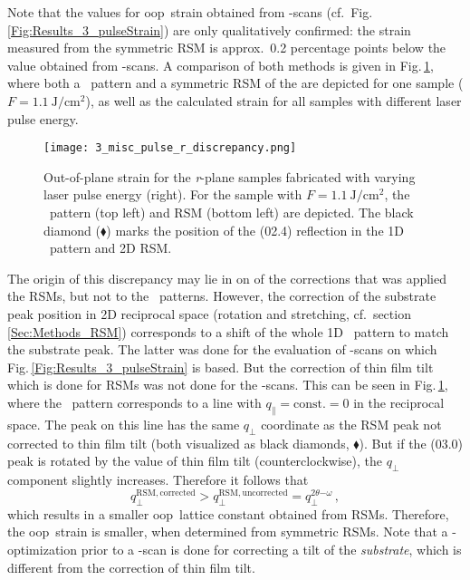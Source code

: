 Note that the values for \gls{oop}\ strain obtained from \thetaomega-scans (cf.\ Fig.\,\ref{Fig:Results_3_pulseStrain}) are only qualitatively confirmed:
the strain measured from the symmetric \gls{RSM} is approx.\ 0.2 percentage points below the value obtained from \thetaomega-scans.
A comparison of both methods is given in Fig.\,\ref{Fig:Results_3_r_strainDiscrepancy}, where both a \thetaomega\ pattern and a symmetric \acrshort{RSM} of the are depicted for one sample ($F=\qty{1.1}{\J\per\cm\squared}$), as well as the calculated strain for all samples with different laser pulse energy.
\begin{figure}[ht]
    \centering
    \texttt{[image: 3\_misc\_pulse\_r\_discrepancy.png]}
    \caption{
        Out-of-plane strain for the \textit{r}-plane samples fabricated with varying laser pulse energy (right).
        For the sample with $F=\qty{1.1}{\J\per\cm\squared}$, the \thetaomega\ pattern (top left) and \gls{RSM} (bottom left) are depicted.
        The black diamond ($\blacklozenge$) marks the position of the (02.4) reflection in the 1D \thetaomega\ pattern and 2D \gls{RSM}.
    }
    \label{Fig:Results_3_r_strainDiscrepancy}
\end{figure}
The origin of this discrepancy may lie in on of the corrections that was applied the \glspl{RSM}, but not to the \thetaomega\ patterns.
However, the correction of the substrate peak position in 2D reciprocal space (rotation and stretching, cf.\ section \ref{Sec:Methods_RSM}) corresponds to a shift of the whole 1D \thetaomega\ pattern to match the substrate peak.
The latter was done for the evaluation of \thetaomega-scans on which Fig.\,\ref{Fig:Results_3_pulseStrain} is based.
But the correction of thin film tilt which is done for \glspl{RSM} was not done for the \thetaomega-scans.
This can be seen in Fig.\,\ref{Fig:Results_3_r_strainDiscrepancy}, where the \thetaomega\ pattern corresponds to a line with $q_\parallel=\mathrm{const.}=0$ in the reciprocal space.
The peak on this line has the same $q_\perp$ coordinate as the RSM peak not corrected to thin film tilt (both visualized as black diamonds, $\blacklozenge$).
But if the (03.0) peak is rotated by the value of thin film tilt (counterclockwise), the $q_\perp$ component slightly increases.
Therefore it follows that
$$q_\perp^\mathrm{RSM, corrected}
>q_\perp^\mathrm{RSM, uncorrected}
=q_\perp^{2\theta\mathrm{-}\omega}\,,$$
which results in a smaller \gls{oop}\ lattice constant obtained from RSMs.
Therefore, the \gls{oop}\ strain is smaller, when determined from symmetric RSMs.
Note that a \textomega-optimization prior to a \thetaomega-scan is done for correcting a tilt of the \textit{substrate}, which is different from the correction of thin film tilt.

